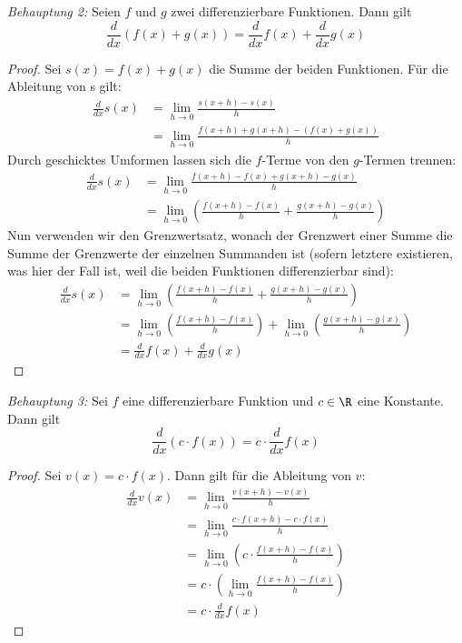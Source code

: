 \emph{Behauptung 2:} Seien $f$ und $g$ zwei differenzierbare Funktionen. Dann gilt
$$\frac{d}{dx} \left(f(x)+g(x)\right) = \frac{d}{dx} f(x) + \frac{d}{dx} g(x)$$
\begin{proof}
    Sei $s(x)=f(x)+g(x)$ die Summe der beiden Funktionen. Für die Ableitung von s gilt:
    \begin{align*}
        \frac{d}{dx}s(x) & = \lim_{h\rightarrow0} \frac{s(x+h)-s(x)}{h}               \\
                         & = \lim_{h\rightarrow0} \frac{f(x+h)+g(x+h)-(f(x)+g(x))}{h}
    \end{align*}
    Durch geschicktes Umformen lassen sich die $f$-Terme von den $g$-Termen trennen:
    \begin{align*}
        \frac{d}{dx} s(x) & = \lim_{h\rightarrow0} \frac{f(x+h)-f(x) +g(x+h)-g(x)}{h}                       \\
                          & = \lim_{h\rightarrow0}\left(\frac{f(x+h)-f(x)}{h} +\frac{g(x+h)-g(x)}{h}\right)
    \end{align*}
    Nun verwenden wir den Grenzwertsatz, wonach der Grenzwert einer Summe die Summe der Grenzwerte der einzelnen Summanden ist (sofern letztere existieren, was hier der Fall ist, weil die beiden Funktionen differenzierbar sind):
    \begin{align*}
        \frac{d}{dx} s(x) & =\lim_{h\rightarrow0}\left(\frac{f(x+h)-f(x)}{h} +\frac{g(x+h)-g(x)}{h}\right)                                    \\
                          & = \lim_{h\rightarrow0}\left(\frac{f(x+h)-f(x)}{h}\right) + \lim_{h\rightarrow0}\left(\frac{g(x+h)-g(x)}{h}\right) \\
                          & = \frac{d}{dx} f(x) + \frac{d}{dx} g(x)
    \end{align*}
\end{proof}
\emph{Behauptung 3:} Sei $f$ eine differenzierbare Funktion und $c\in \R$ eine Konstante. Dann gilt
$$\frac{d}{dx}\left(c\cdot f(x)\right) = c\cdot \frac{d}{dx} f(x)$$
\begin{proof}
    Sei $v(x) = c\cdot f(x)$. Dann gilt für die Ableitung von $v$:
    \begin{align*}
        \frac{d}{dx} v(x) & =\lim_{h\rightarrow0} \frac{v(x+h)-v(x)}{h}                       \\
                          & = \lim_{h\rightarrow0} \frac{c\cdot f(x+h)-c\cdot f(x)}{h}        \\
                          & =\lim_{h\rightarrow0} \left( c\cdot \frac{f(x+h)-f(x)}{h} \right) \\
                          & = c\cdot \left(\lim_{h\rightarrow0} \frac{f(x+h)-f(x)}{h}\right)  \\
                          & = c\cdot \frac{d}{dx}f(x)
    \end{align*}
\end{proof}
\clearpage

